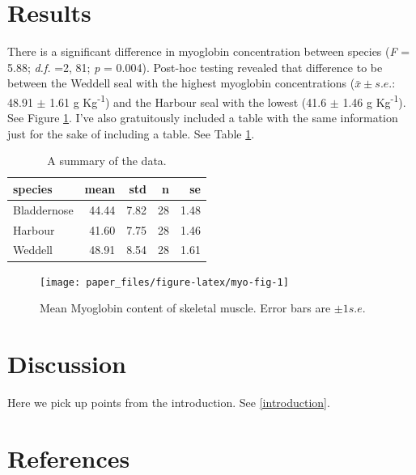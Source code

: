 \documentclass[
]{article}
\begin{document}
\hypertarget{results}{%
\section{Results}\label{results}}

There is a significant difference in myoglobin concentration between species (\emph{F} = 5.88; \emph{d.f.} =2, 81; \emph{p} = 0.004). Post-hoc testing revealed that difference to be between the Weddell seal with the highest myoglobin concentrations (\(\bar{x} \pm s.e.\): 48.91 \(\pm\) 1.61 g Kg\textsuperscript{-1}) and the Harbour seal with the lowest (41.6 \(\pm\) 1.46 g Kg\textsuperscript{-1}). See Figure \ref{fig:myo-fig}.
I've also gratuitously included a table with the same information just for the sake of including a table. See Table \ref{tab:summary-table}.

\begin{table}

\caption{\label{tab:summary-table}A summary of the data.}
\centering
\begin{tabular}[t]{l|r|r|r|r}
\hline
species & mean & std & n & se\\
\hline
Bladdernose & 44.44 & 7.82 & 28 & 1.48\\
\hline
Harbour & 41.60 & 7.75 & 28 & 1.46\\
\hline
Weddell & 48.91 & 8.54 & 28 & 1.61\\
\hline
\end{tabular}
\end{table}



\begin{figure}
\texttt{[image: paper\_files/figure-latex/myo-fig-1]} \caption{Mean Myoglobin content of skeletal muscle. Error bars are \(\pm 1 s.e.\)}\label{fig:myo-fig}
\end{figure}

\hypertarget{discussion}{%
\section{Discussion}\label{discussion}}

Here we pick up points from the introduction. See \ref{introduction}.

\hypertarget{references}{%
\section*{References}\label{references}}
\end{document}
